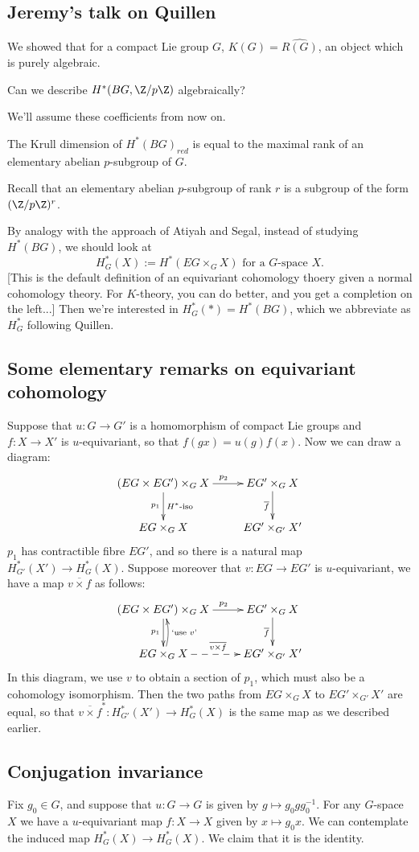 \documentclass[11pt]{article}
\newcommand{\KanSemResponse}[1]
{
\thispagestyle{fancy}
\section{#1}
}
\begin{document}
\begin{JeremyQuillen}
\KanSemResponse
{Jeremy's talk on Quillen}
We showed that for a compact Lie group $G$, $K(G)=\widehat{R(G)}$, an object which is purely algebraic.
\begin{question}
Can we describe $H^*(BG,\Z/p\Z)$ algebraically?
\end{question}
We'll assume these coefficients from now on.
\begin{conjecture}
The Krull dimension of $H^*(BG)_{red}$ is equal to the maximal rank of an elementary abelian $p$-subgroup of $G$.
\end{conjecture}
\noindent Recall that an elementary abelian $p$-subgroup of rank $r$ is a subgroup of the form $(\Z/p\Z)^r$.

By analogy with the approach of Atiyah and Segal, instead of studying $H^*(BG)$, we should look at 
\[H^*_G(X):=H^*(EG\times_G X)\text{ for a $G$-space $X$}.\]
[This is the default definition of an equivariant cohomology thoery given a normal cohomology theory. For $K$-theory, you can do better, and you get a completion on the left...]
Then we're interested in $H^*_G(\ast)=H^*(BG)$, which we abbreviate as $H_G^*$ following Quillen.
\subsection*{Some elementary remarks on equivariant cohomology}
Suppose that $u:G\to G'$ is a homomorphism of compact Lie groups and $f:X\to X'$ is $u$-equivariant, so that $f(gx)=u(g)f(x)$. Now we can draw a diagram:
\[\xymatrix{
(EG\times EG')\times_G X\ar[r]^{\ \ \ p_2}\ar[d]_{p_1}^{\text{$H^*$-iso}}&EG'\times_GX\ar[d]_{\overline f}\\
EG\times_G X&EG'\times_{G'}X'
}\]
$p_1$ has contractible fibre $EG'$, and so there is a natural map $H^*_{G'}(X')\to H^*_{G}(X)$. Suppose moreover that $v:EG\to EG'$ is $u$-equivariant, we have a map ${\overline{v\times f}}$ as follows:
\[\xymatrix{
(EG\times EG')\times_G X\ar[r]^{\ \ \ p_2}\ar[d]_{p_1}&EG'\times_GX \ar[d]_{\overline f}\\
\ar@/_1ex/[u]_{\text{`use $v$'}}\ar@{-->}[r]^{\overline{v\times f}}EG\times_G X&EG'\times_{G'}X'
}\]
In this diagram, we use $v$ to obtain a section of $p_1$, which must also be a cohomology isomorphism. Then the two paths from $EG\times_G X$ to $EG'\times_{G'}X'$ are equal, so that $\overline{v\times f}^*:H^*_{G'}(X')\to H^*_{G}(X)$ is the same map as we described earlier.
\subsection*{Conjugation invariance}
Fix $g_0\in G$, and suppose that $u:G\to G$ is given by $g\mapsto g_0gg_0^{-1}$. For any $G$-space $X$ we have a $u$-equivariant map $f:X\to X$ given by $x\mapsto g_0x$. We can contemplate the induced map $H^*_G(X)\to H^*_G(X)$. We claim that it is the identity.


\end{JeremyQuillen}
\end{document}
